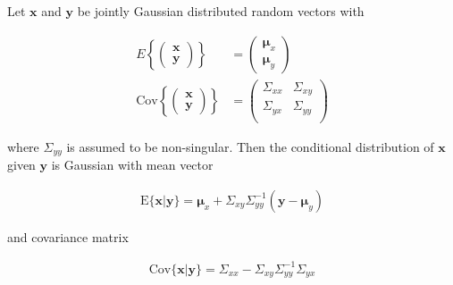 \begin{lemma}

    Let $\mathbf{x}$ and $\mathbf{y}$ be jointly Gaussian distributed random
    vectors with

    \begin{align*}
        E\left\{\left(\begin{array}{c}
                          \mathbf{x}\\
                          \mathbf{y}
                      \end{array}\right)\right\}&=\left(\begin{array}{c}
                                                           \boldsymbol{\mu}_x\\
                                                           \boldsymbol{\mu}_y
                                                       \end{array}\right)\\
        \text{Cov}\left\{\left(\begin{array}{c}
                                   \mathbf{x}\\
                                   \mathbf{y}
                               \end{array}\right)\right\}&=\left(\begin{array}{cc}
                                                                     \Sigma_{xx} & \Sigma_{xy} \\
                                                                     \Sigma_{yx} & \Sigma_{yy} \\
                                                                  \end{array}\right)
    \end{align*}

    \noindent where $\Sigma_{yy}$ is assumed to be non-singular.
    Then the conditional distribution of $\mathbf{x}$ given $\mathbf{y}$ is
    Gaussian with mean vector

    \begin{align*}
        \text{E}\{\mathbf{x}|\mathbf{y}\}=\boldsymbol{\mu}_x+\Sigma_{xy}\Sigma_{yy}^{-1}(\mathbf{y}-\boldsymbol{\mu}_y)
    \end{align*}

    \noindent and covariance matrix

    \begin{align*}
        \text{Cov}\{\mathbf{x}|\mathbf{y}\}=\Sigma_{xx}-\Sigma_{xy}\Sigma_{yy}^{-1}\Sigma_{yx}
    \end{align*}

    \label{lemma:conditionalGaussians}

\end{lemma}

